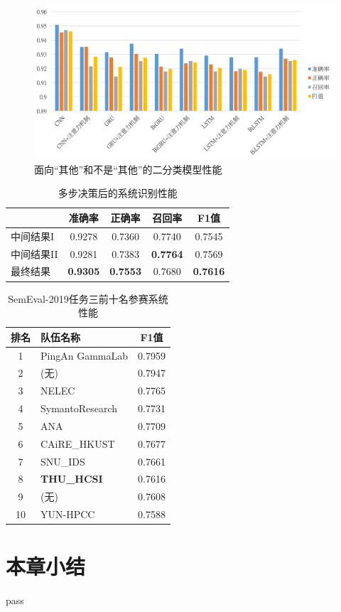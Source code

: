 \begin{figure}[H]
  \centering
  \includegraphics[width=\textwidth]{img/exp_context_emo_tri_result_bar.png}
  \caption{面向“其他”和不是“其他”的二分类模型性能}
  \label{fig:exp_context_emo_tri_result_bar}
\end{figure}

\begin{table}[htb]
  \centering
  \begin{minipage}[t]{0.6\linewidth}
  \caption{多步决策后的系统识别性能}
  \label{tab:exp_context_emo_ensemble_result}
    \begin{tabularx}{\linewidth}{X|cccc}
    \toprule[1.5pt]
    & 准确率 & 正确率 & 召回率 & F1值 \\
    \hline
    中间结果I & 0.9278 & 0.7360 & 0.7740 & 0.7545 \\
    中间结果II & 0.9281 & 0.7383 & \bf 0.7764 & 0.7569 \\
    \hline
    最终结果 & \bf 0.9305 & \bf 0.7553 & 0.7680 & \bf 0.7616 \\ 
    \bottomrule[1.5pt]
    \end{tabularx}
  \end{minipage}
\end{table}

\begin{table}[htb]
  \centering
  \begin{minipage}[t]{0.6\linewidth}
  \caption{SemEval-2019任务三前十名参赛系统性能} %
  \label{tab:exp_context_emo_other_comp}
    \begin{tabularx}{\linewidth}{c|X|c}
    \toprule[1.5pt]
    排名 & 队伍名称 & F1值 \\
    \hline
    1 & PingAn GammaLab & 0.7959 \\
    2 & (无) & 0.7947 \\
    3 & NELEC & 0.7765 \\
    4 & SymantoResearch & 0.7731 \\
    5 & ANA & 0.7709 \\
    6 & CAiRE\_HKUST & 0.7677 \\
    7 & SNU\_IDS & 0.7661 \\
    8 & \bf THU\_HCSI & 0.7616 \\
    9 & (无) & 0.7608 \\
    10 & YUN-HPCC & 0.7588 \\
    \bottomrule[1.5pt]
    \end{tabularx}
  \end{minipage}
\end{table}



\section{本章小结}

pass

